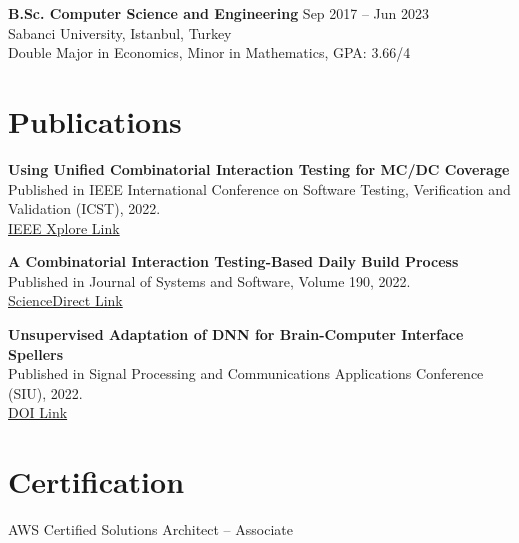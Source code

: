 \documentclass[10pt,letterpaper]{article}
\begin{document}
\textbf{B.Sc. Computer Science and Engineering} \hfill Sep 2017 -- Jun 2023 \\
Sabanci University, Istanbul, Turkey \\
Double Major in Economics, Minor in Mathematics, GPA: 3.66/4

\iflongcv
\section*{Publications}
\textbf{Using Unified Combinatorial Interaction Testing for MC/DC Coverage} \\
Published in IEEE International Conference on Software Testing, Verification and Validation (ICST), 2022. \\
\href{https://ieeexplore.ieee.org/document/9787934}{IEEE Xplore Link}

\textbf{A Combinatorial Interaction Testing-Based Daily Build Process} \\
Published in Journal of Systems and Software, Volume 190, 2022. \\
\href{https://www.sciencedirect.com/science/article/abs/pii/S0164121222000875}{ScienceDirect Link}

\textbf{Unsupervised Adaptation of DNN for Brain-Computer Interface Spellers} \\
Published in Signal Processing and Communications Applications Conference (SIU), 2022. \\
\href{https://doi.org/10.1109/SIU55565.2022.9864700}{DOI Link}

\section*{Certification}
AWS Certified Solutions Architect -- Associate
\fi
\end{document}

